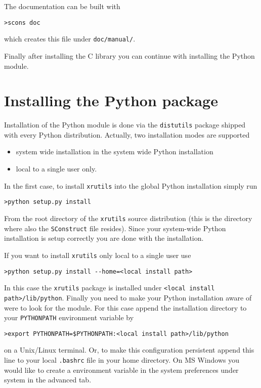 The documentation can be built with 
\begin{verbatim}
>scons doc
\end{verbatim}
which creates this file under {\tt doc/manual/}.

Finally after installing the C library you can continue with installing the
Python module.

\section{Installing the Python package}

Installation of the Python module is done via the {\tt distutils} package
shipped with every Python distribution. Actually, two installation modes are 
supported
\begin{itemize}
 \item system wide installation in the system wide Python installation
 \item local to a single user only.
\end{itemize}

In the first case, to install {\tt xrutils} into the global Python installation
simply run
\begin{verbatim}
>python setup.py install
\end{verbatim}
From the root directory of the {\tt xrutils} source distribution (this is the
directory where also the {\tt SConstruct} file resides). Since your system-wide
Python installation is setup correctly you are done with the installation.

If you want to install
{\tt xrutils} only local to a single user use
\begin{verbatim}
>python setup.py install --home=<local install path>
\end{verbatim}
In this case the {\tt xrutils} package is installed under {\tt <local install
path>/lib/python}. Finally you need to make your Python installation aware of
were to look for the module. For this case append the installation directory to
your {\tt PYTHONPATH} environment variable by 
\begin{verbatim}
>export PYTHONPATH=$PYTHONPATH:<local install path>/lib/python
\end{verbatim}
on a Unix/Linux terminal. Or, to make this configuration persistent append this line to
your local {\tt .bashrc} file in your home directory. On MS Windows you would like to create a environment variable in the 
system preferences under system in the advanced tab.
